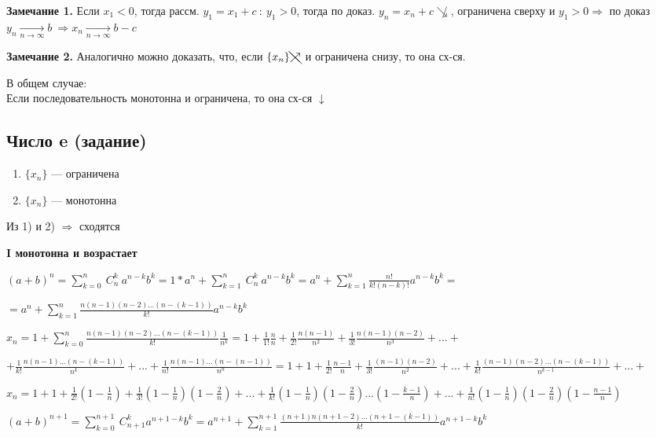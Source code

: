 \documentclass{article}
\begin{document}
    \textbf{Замечание 1.} 
    Если \(x_1 < 0\), тогда рассм. \(y_1 = x_1 + c\ : \ y_1 > 0\), тогда по доказ. \( y_n = x_n + c \not\searrow \), ограничена сверху и \( y_1 > 0 \Rightarrow \) по доказ \(y_n \xrightarrow[n \rightarrow \infty]{} b\ \Rightarrow x_n \xrightarrow[n \rightarrow \infty]{} b - c\)
    
    \textbf{Замечание 2.}
    Аналогично можно доказать, что, если \(\{x_n\} \bcancel{\nearrow}\) и ограничена снизу, то она сх-ся.
    
    В общем случае:
    \\ Если последовательность монотонна и ограничена, то она сх-ся \(\downarrow\)
    
    \subsection{Число e (задание)}
    
    \begin{enumerate}
    	\item \( \{ x_n \} \) --- ограничена
    	\item \( \{ x_n \} \) --- монотонна
    \end{enumerate}
    
    Из 1) и 2) \( \Rightarrow \) сходятся

    \textbf{I монотонна и возрастает}

    \((a+b)^n = \sum_{k=0}^n\ C^k_n \ a^{n-k}b^k=1*a^n+\sum_{k=1}^n\ C^k_n \ a^{n-k}b^k = a^n+\sum_{k=1}^n \frac{n!}{k!(n-k)!} a^{n-k}b^k = \)

    \( = a^n + \sum_{k=1}^n \frac{n(n-1)(n-2)...(n-(k-1))}{k!} a^{n-k} b^k\)

    \( x_n = 1 + \sum_{k=0}^n \frac{n(n-1)(n-2)...(n-(k-1))}{k!} \frac{1}{n^k} = 1 + \frac{1}{1!} \frac{n}{n} + \frac{1}{2!} \frac{n(n-1)}{n^2} + \frac{1}{3!} \frac{n(n-1)(n-2)}{n^3} + ... + \)

    \( + \frac{1}{k!} \frac{n(n-1)...(n-(k-1))}{n^k} + ... + \frac{1}{n!} \frac{n(n-1)...(n-(n-1))}{n^n} = 1 + 1 + \frac{1}{2!} \frac{n-1}{n} + \frac{1}{3!} \frac{(n-1)(n-2)}{n^2} + ... + \frac{1}{k!} \frac{(n-1)(n-2)...(n-(k-1))}{n^{k-1}} + ... +\)

    \(x_n = 1+1+\frac{1}{2!}(1-\frac{1}{n})+\frac{1}{3!}(1-\frac{1}{n})(1-\frac{2}{n})+...+\frac{1}{k!}(1-\frac{1}{n})(1-\frac{2}{n})...(1-\frac{k-1}{n}) + ... + \frac{1}{n!} (1 - \frac{1}{n})(1 - \frac{2}{n})(1 - \frac{n-1}{n})\)

    \((a+b)^{n+1} = \sum_{k=0}^{n+1}\ C_{n+1}^k a^{n+1-k} b^k = a^{n+1} + \sum_{k=1}^{n+1} \frac{(n+1)n(n+1-2)...(n+1-(k-1))}{k!} a^{n+1-k} b^k\)
\end{document}
